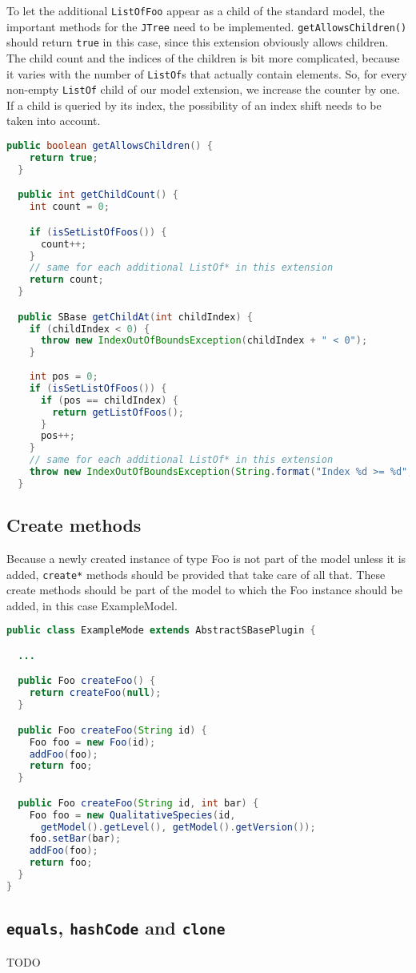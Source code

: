 To let the additional \texttt{ListOfFoo} appear as a child of the standard model, the important methods for the \texttt{JTree} need to be implemented.
\texttt{getAllowsChildren()} should return \texttt{true} in this case, since this extension obviously allows children.
The child count and the indices of the children is bit more complicated, because it varies with the number of \texttt{ListOf}s that actually contain elements.
So, for every non-empty \texttt{ListOf} child of our model extension, we increase the counter by one.
If a child is queried by its index, the possibility of an index shift needs to be taken into account.

\begin{lstlisting}[language=Java,caption={Convenience method to retrieve the extended model},label=lst:ModelExtChildren]
  public boolean getAllowsChildren() {
    return true;
  }

  public int getChildCount() {
    int count = 0;

    if (isSetListOfFoos()) {
      count++;
    }
    // same for each additional ListOf* in this extension
    return count;
  }

  public SBase getChildAt(int childIndex) {
    if (childIndex < 0) {
      throw new IndexOutOfBoundsException(childIndex + " < 0");
    }
      
    int pos = 0;
    if (isSetListOfFoos()) {
      if (pos == childIndex) {
        return getListOfFoos();
      }
      pos++;
    }
    // same for each additional ListOf* in this extension
    throw new IndexOutOfBoundsException(String.format("Index %d >= %d", childIndex, +((int) Math.min(pos, 0))));    
  }
\end{lstlisting}



\subsection{Create methods}

Because a newly created instance of type Foo is not part of the model unless it is added,
\texttt{create*} methods should be provided that take care of all that.
These create methods should be part of the model to which the Foo instance should be added, in this case ExampleModel.

\begin{lstlisting}[language=Java,caption={Convenience method to retrieve the extended model},label=lst:ModelExtCreateMethods]
public class ExampleMode extends AbstractSBasePlugin {

  ...

  public Foo createFoo() {
    return createFoo(null);
  }

  public Foo createFoo(String id) {
    Foo foo = new Foo(id);
    addFoo(foo);
    return foo;
  }

  public Foo createFoo(String id, int bar) {
    Foo foo = new QualitativeSpecies(id,
      getModel().getLevel(), getModel().getVersion());
    foo.setBar(bar);
    addFoo(foo);
    return foo;
  }
}
\end{lstlisting}


\subsection{\texttt{equals}, \texttt{hashCode} and \texttt{clone}}

TODO
